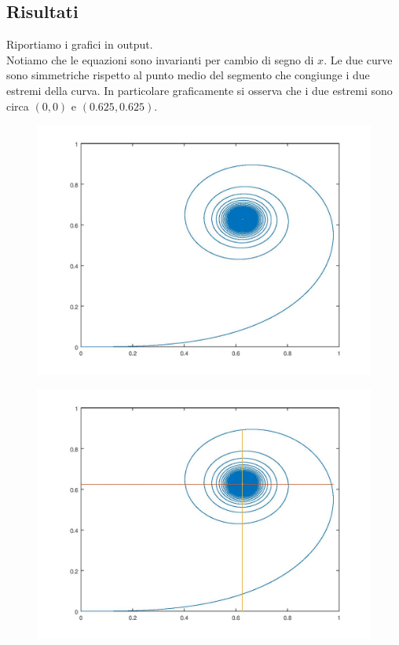 \documentclass{article}
\begin{document}
	\subsection{Risultati}
	Riportiamo i grafici in output.\\
	Notiamo che le equazioni sono invarianti per cambio di segno di $x$. Le due curve sono simmetriche rispetto al punto medio del segmento che congiunge i due estremi della curva. In particolare graficamente si osserva che i due estremi sono circa $(0,0)$ e $(0.625, 0.625)$.
	\begin{figure}[htp!]
		\centering 
		\includegraphics[width=\textwidth]{7_1_a.jpeg}
	\end{figure}
	\begin{figure}[htp!]
		\centering 
		\includegraphics[width=\textwidth]{7_1_a_bis.jpeg}
	\end{figure}
\end{document}

